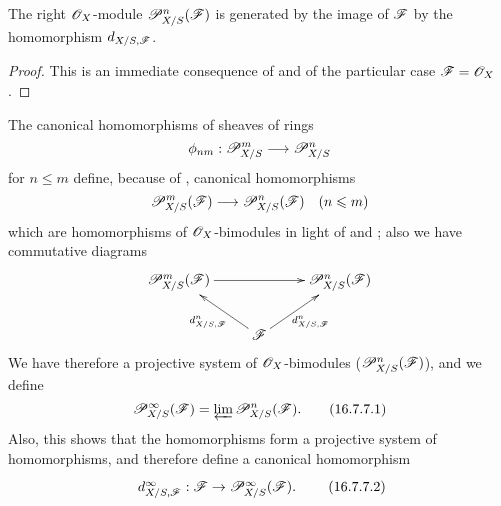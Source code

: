 \begin{proposition}[16.7.6]
\label{IV.16.7.6}
The right $\mathscr{O}_X$-module $\mathscr{P}_{X/S}^n(\mathscr{F})$ is generated by the image of $\mathscr{F}$ by the homomorphism $d_{X/S, \mathscr{F}}$.
\end{proposition}

\begin{proof}
This is an immediate consequence of  and of the particular case $\mathscr{F} = \mathscr{O}_X$ .
\end{proof}

\begin{env}[16.7.7]
\label{IV.16.7.7}
The canonical homomorphisms of sheaves of rings
\[
  \phi_{nm}:\sh{P}_{X/S}^m \to \sh{P}_{X/S}^n 
\]
for $n \leq m$  define, because of , canonical homomorphisms 
\[
  \sh{P}_{X/S}^m(\sh{F}) \to \sh{P}_{X/S}^n(\sh{F}) \quad (n \leq m)
\]
which are homomorphisms of $\mathscr{O}_X$-bimodules in light of  and ;
also we have commutative diagrams
\[
  \xymatrix{
    \sh{P}_{X/S}^m(\sh{F}) \ar[rr] && \sh{P}_{X/S}^n(\sh{F}) \\
      & \sh{F} \ar[ul]^-{d_{X/S,\sh{F}}^n} \ar[ur]_-{d_{X/S,\sh{F}}^n}
  }
\]
We have therefore a projective system of $\mathscr{O}_X$-bimodules ($\mathscr{P}_{X/S}^n(\mathscr{F})$), and we define
\[
  \label{IV.16.7.7.1}
  \mathscr{P}_{X/S}^\infty(\mathscr{F}) = \varprojlim \mathscr{P}_{X/S}^n(\mathscr{F}).
  \tag{16.7.7.1}
\]
Also, this shows that the homomorphisms  form a projective system of homomorphisms, and therefore define a canonical homomorphism
\[
  \label{IV.16.7.7.2}
  \xymatrix{
    d_{X/S,\sh{F}}^\infty: \sh{F} \to \sh{P}_{X/S}^\infty(\sh{F}).
  }
  \tag{16.7.7.2}
\]
\end{env}


